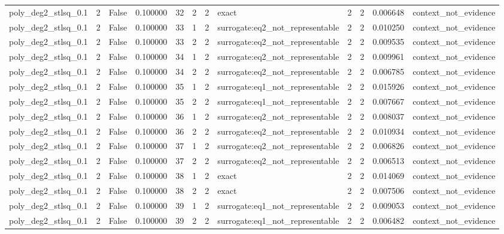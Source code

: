 \begin{tabular}{lrrrrrrlrrrl}
poly\_deg2\_stlsq\_0.1 & 2 & False & 0.100000 & 32 & 2 & 2 & exact & 2 & 2 & 0.006648 & context\_not\_evidence \\
poly\_deg2\_stlsq\_0.1 & 2 & False & 0.100000 & 33 & 1 & 2 & surrogate:eq2\_not\_representable & 2 & 2 & 0.010250 & context\_not\_evidence \\
poly\_deg2\_stlsq\_0.1 & 2 & False & 0.100000 & 33 & 2 & 2 & surrogate:eq2\_not\_representable & 2 & 2 & 0.009535 & context\_not\_evidence \\
poly\_deg2\_stlsq\_0.1 & 2 & False & 0.100000 & 34 & 1 & 2 & surrogate:eq2\_not\_representable & 2 & 2 & 0.009961 & context\_not\_evidence \\
poly\_deg2\_stlsq\_0.1 & 2 & False & 0.100000 & 34 & 2 & 2 & surrogate:eq2\_not\_representable & 2 & 2 & 0.006785 & context\_not\_evidence \\
poly\_deg2\_stlsq\_0.1 & 2 & False & 0.100000 & 35 & 1 & 2 & surrogate:eq1\_not\_representable & 2 & 2 & 0.015926 & context\_not\_evidence \\
poly\_deg2\_stlsq\_0.1 & 2 & False & 0.100000 & 35 & 2 & 2 & surrogate:eq1\_not\_representable & 2 & 2 & 0.007667 & context\_not\_evidence \\
poly\_deg2\_stlsq\_0.1 & 2 & False & 0.100000 & 36 & 1 & 2 & surrogate:eq2\_not\_representable & 2 & 2 & 0.008037 & context\_not\_evidence \\
poly\_deg2\_stlsq\_0.1 & 2 & False & 0.100000 & 36 & 2 & 2 & surrogate:eq2\_not\_representable & 2 & 2 & 0.010934 & context\_not\_evidence \\
poly\_deg2\_stlsq\_0.1 & 2 & False & 0.100000 & 37 & 1 & 2 & surrogate:eq2\_not\_representable & 2 & 2 & 0.006826 & context\_not\_evidence \\
poly\_deg2\_stlsq\_0.1 & 2 & False & 0.100000 & 37 & 2 & 2 & surrogate:eq2\_not\_representable & 2 & 2 & 0.006513 & context\_not\_evidence \\
poly\_deg2\_stlsq\_0.1 & 2 & False & 0.100000 & 38 & 1 & 2 & exact & 2 & 2 & 0.014069 & context\_not\_evidence \\
poly\_deg2\_stlsq\_0.1 & 2 & False & 0.100000 & 38 & 2 & 2 & exact & 2 & 2 & 0.007506 & context\_not\_evidence \\
poly\_deg2\_stlsq\_0.1 & 2 & False & 0.100000 & 39 & 1 & 2 & surrogate:eq1\_not\_representable & 2 & 2 & 0.009053 & context\_not\_evidence \\
poly\_deg2\_stlsq\_0.1 & 2 & False & 0.100000 & 39 & 2 & 2 & surrogate:eq1\_not\_representable & 2 & 2 & 0.006482 & context\_not\_evidence \\

\end{tabular}
